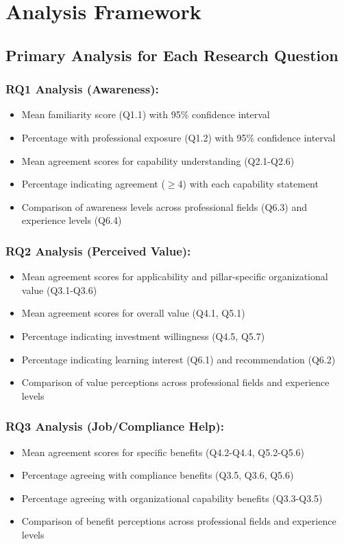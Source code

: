   \section{Analysis Framework}

  \subsection{Primary Analysis for Each Research Question}

  \subsubsection{RQ1 Analysis (Awareness):}
  \begin{itemize}
    \item Mean familiarity score (Q1.1) with 95\% confidence interval
    \item Percentage with professional exposure (Q1.2) with 95\% confidence interval
    \item Mean agreement scores for capability understanding (Q2.1-Q2.6)
    \item Percentage indicating agreement (\(\geq\)4) with each capability statement
    \item Comparison of awareness levels across professional fields (Q6.3) and experience levels (Q6.4)
  \end{itemize}

  \subsubsection{RQ2 Analysis (Perceived Value):}
  \begin{itemize}
    \item Mean agreement scores for applicability and pillar-specific organizational value (Q3.1-Q3.6)
    \item Mean agreement scores for overall value (Q4.1, Q5.1)
    \item Percentage indicating investment willingness (Q4.5, Q5.7)
    \item Percentage indicating learning interest (Q6.1) and recommendation (Q6.2)
    \item Comparison of value perceptions across professional fields and experience levels
  \end{itemize}

  \subsubsection{RQ3 Analysis (Job/Compliance Help):}
  \begin{itemize}
    \item Mean agreement scores for specific benefits (Q4.2-Q4.4, Q5.2-Q5.6)
    \item Percentage agreeing with compliance benefits (Q3.5, Q3.6, Q5.6)
    \item Percentage agreeing with organizational capability benefits (Q3.3-Q3.5)
    \item Comparison of benefit perceptions across professional fields and experience levels
  \end{itemize}


